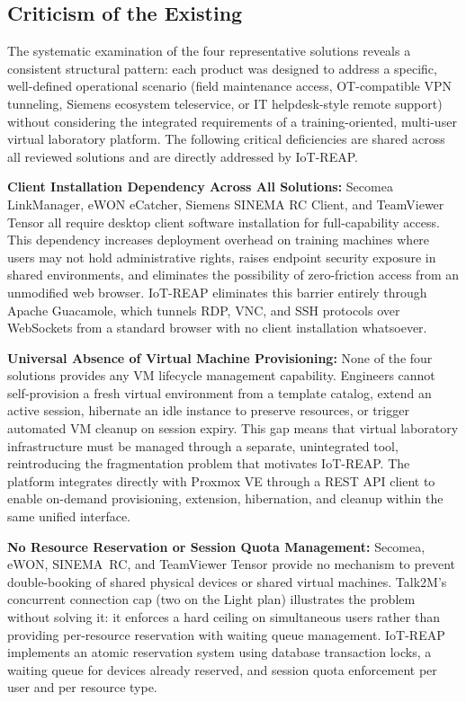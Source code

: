 \subsection{Criticism of the Existing}

The systematic examination of the four representative solutions reveals a
consistent structural pattern: each product was designed to address a specific,
well-defined operational scenario (field maintenance access, OT-compatible VPN
tunneling, Siemens ecosystem teleservice, or IT helpdesk-style remote support)
without considering the integrated requirements of a training-oriented,
multi-user virtual laboratory platform. The following critical deficiencies
are shared across all reviewed solutions and are directly addressed by IoT-REAP.

\textbf{Client Installation Dependency Across All Solutions:}
Secomea LinkManager, eWON eCatcher, Siemens SINEMA RC Client, and TeamViewer
Tensor all require desktop client software installation for full-capability
access. This dependency increases deployment overhead on training machines
where users may not hold administrative rights, raises endpoint security
exposure in shared environments, and eliminates the possibility of zero-friction
access from an unmodified web browser. IoT-REAP eliminates this barrier entirely
through Apache Guacamole, which tunnels RDP, VNC, and SSH protocols over
WebSockets from a standard browser with no client installation whatsoever.

\textbf{Universal Absence of Virtual Machine Provisioning:}
None of the four solutions provides any VM lifecycle management capability.
Engineers cannot self-provision a fresh virtual environment from a template
catalog, extend an active session, hibernate an idle instance to preserve
resources, or trigger automated VM cleanup on session expiry. This gap means
that virtual laboratory infrastructure must be managed through a separate,
unintegrated tool, reintroducing the fragmentation problem that motivates
IoT-REAP. The platform integrates directly with Proxmox VE through a REST API
client to enable on-demand provisioning, extension, hibernation, and cleanup
within the same unified interface.

\textbf{No Resource Reservation or Session Quota Management:}
Secomea, eWON, SINEMA~RC, and TeamViewer Tensor provide no mechanism to prevent
double-booking of shared physical devices or shared virtual machines. Talk2M's
concurrent connection cap (two on the Light plan) illustrates the problem
without solving it: it enforces a hard ceiling on simultaneous users rather
than providing per-resource reservation with waiting queue management.
IoT-REAP implements an atomic reservation system using database transaction
locks, a waiting queue for devices already reserved, and session quota
enforcement per user and per resource type.


